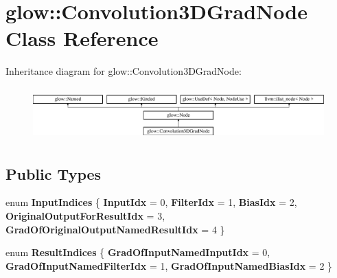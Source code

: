 \hypertarget{classglow_1_1_convolution3_d_grad_node}{}\section{glow\+:\+:Convolution3\+D\+Grad\+Node Class Reference}
\label{classglow_1_1_convolution3_d_grad_node}
Inheritance diagram for glow\+:\+:Convolution3\+D\+Grad\+Node\+:\begin{figure}[H]
\begin{center}
\leavevmode
\includegraphics[height=2.028986cm]{classglow_1_1_convolution3_d_grad_node}
\end{center}
\end{figure}
\subsection*{Public Types}
\begin{DoxyCompactItemize}
\item 
\mbox{\label{classglow_1_1_convolution3_d_grad_node_aaebe2b4f14f1120e073e534ad454e5c4}} 
enum {\bfseries Input\+Indices} \{ \newline
{\bfseries Input\+Idx} = 0, 
{\bfseries Filter\+Idx} = 1, 
{\bfseries Bias\+Idx} = 2, 
{\bfseries Original\+Output\+For\+Result\+Idx} = 3, 
\newline
{\bfseries Grad\+Of\+Original\+Output\+Named\+Result\+Idx} = 4
 \}
\item 
\mbox{\label{classglow_1_1_convolution3_d_grad_node_abe59b48e58e9e41d438fb3038878e471}} 
enum {\bfseries Result\+Indices} \{ {\bfseries Grad\+Of\+Input\+Named\+Input\+Idx} = 0, 
{\bfseries Grad\+Of\+Input\+Named\+Filter\+Idx} = 1, 
{\bfseries Grad\+Of\+Input\+Named\+Bias\+Idx} = 2
 \}
\end{DoxyCompactItemize}
